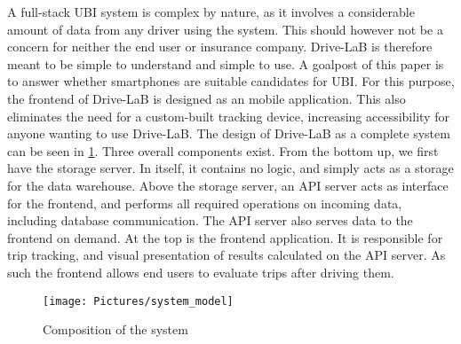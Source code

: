 A full-stack UBI system is complex by nature, as it involves a considerable amount of data from any driver using the system. This should however not be a concern for neither the end user or insurance company. Drive-LaB is therefore meant to be simple to understand and simple to use.
A goalpost of this paper is to answer whether smartphones are suitable candidates for UBI. For this purpose, the frontend of Drive-LaB is designed as an mobile application. This also eliminates the need for a custom-built tracking device, increasing accessibility for anyone wanting to use Drive-LaB.
The design of Drive-LaB as a complete system can be seen in \ref{fig:system_model}. Three overall components exist. From the bottom up, we first have the storage server. In itself, it contains no logic, and simply acts as a storage for the data warehouse. Above the storage server, an API server acts as interface for the frontend, and performs all required operations on incoming data, including database communication. The API server also serves data to the frontend on demand. At the top is the frontend application. It is responsible for trip tracking, and visual presentation of results calculated on the API server. As such the frontend allows end users to evaluate trips after driving them.

\begin{figure}[tb]
\centering
\texttt{[image: Pictures/system\_model]}
\caption{Composition of the system}
\label{fig:system_model}
\end{figure}